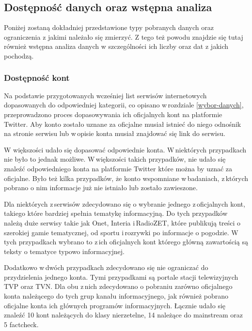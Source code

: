 \subsection{Dostępność danych oraz wstępna analiza}
Poniżej zostaną dokładniej przedstawione typy pobranych danych oraz ograniczenia z jakimi należało się zmierzyć. Z tego też powodu znajdzie się tutaj również wstępna analiza danych w szczególności ich liczby oraz dat z jakich pochodzą. 
\subsubsection{Dostępność kont }
Na podstawie przygotowanych wcześniej list serwisów internetowych dopasowanych do odpowiedniej kategorii, co opisano w\,rozdziale \ref{wybor-danych}, przeprowadzono proces dopasowywania ich oficjalnych kont na platformie Twitter. Aby konto zostało uznane za oficjalne musiał istnieć do niego odnośnik na stronie serwisu lub w\,opisie konta musiał znajdować się link do serwisu. 
\par
W większości udało się dopasować odpowiednie konta. W\,niektórych przypadkach nie było to jednak możliwe. W\,większości takich przypadków, nie udało się znaleźć odpowiedniego konta na platformie Twitter które można by uznać za oficjalne. Było też kilka przypadków, że konto wspomniane w\,badaniach, z\,których pobrano o nim informacje już nie istniało lub zostało zawieszone.
\par
Dla niektórych z\,serwisów zdecydowano się o wybranie jednego z\,oficjalnych kont, takiego które bardziej spełnia tematykę informacyjną. Do tych przypadków należą duże serwisy takie jak Onet, Interia i\,RadioZET, które publikują treści o szerokiej gamie tematycznej, od sportu i\,rozrywki po informacje o pogodzie.  W\,tych przypadkach wybrano to z\,ich oficjalnych kont którego główną zawartością są teksty o tematyce typowo informacyjnej. 
\par
Dodatkowo w\,dwóch przypadkach zdecydowano się nie ograniczać do przydzielenia jednego konta. Tymi przypadkami są portale stacji telewizyjnych TVP oraz TVN. Dla obu z\,nich zdecydowano o pobraniu zarówno oficjalnego konta należącego do tych grup kanału informacyjnego, jak również pobrano oficjalne konta ich głównych programów informacyjnych. 
Łącznie udało się znaleźć 10 kont należących do klasy nierzetelne, 14 należące do mainstream oraz 5 factcheck.

